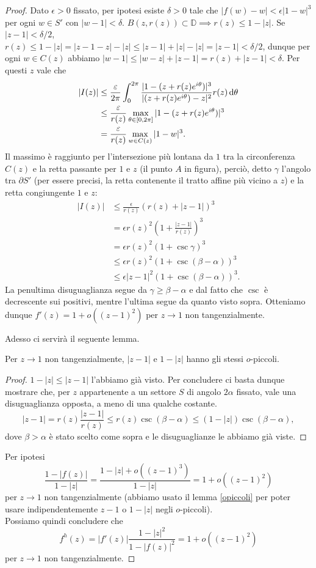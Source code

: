 \begin{proof}
  Dato $\epsilon>0$ fissato, per ipotesi esiste $\delta>0$ tale che $|f(w)-w|<\epsilon|1-w|^3$ per ogni $w \in S'$ con $|w-1|<\delta$. $B(z,r(z)) \subset \mathbb{D} \implies r(z) \le 1-|z|$. Se $|z-1|<\delta/2$, $r(z) \le 1-|z|=|z-1-z|-|z| \le |z-1|+|z|-|z|=|z-1|<\delta/2$, dunque per ogni $w \in C(z)$ abbiamo $|w-1| \le |w-z|+|z-1|=r(z)+|z-1|<\delta$. Per questi $z$ vale che
  \begin{align*}
    |I(z)| & \le \frac{\varepsilon}{2\pi} \int_0^{2\pi} \frac{|1-(z+r(z)e^{i\theta})|^3}{|(z+r(z)e^{i\theta})-z|^2}r(z)\mathop{}\!\mathrm{d}\theta \\
    & \le \frac{\varepsilon}{r(z)}\max_{\theta \in [0,2\pi]} |1-(z+r(z)e^{i\theta})|^3 \\
    & =\frac{\varepsilon}{r(z)}\max_{w \in C(z)}|1-w|^3.
  \end{align*}
  Il massimo è raggiunto per l'intersezione più lontana da $1$ tra la circonferenza $C(z)$ e la retta passante per $1$ e $z$ (il punto $A$ in figura), perciò, detto $\gamma$ l'angolo tra $\partial S'$ (per essere precisi, la retta contenente il tratto affine più vicino a $z$) e la retta congiungente $1$ e $z$:
  \begin{align*}
    |I(z)| & \le \frac{\epsilon}{r(z)}(r(z)+|z-1|)^3 \\
    & =\epsilon r(z)^2\left(1+\frac{|z-1|}{r(z)}\right)^3 \\
    & =\epsilon r(z)^2(1+\csc\gamma)^3 \\
    & \le \epsilon r(z)^2(1+\csc(\beta-\alpha))^3 \\
    & \le \epsilon |z-1|^2(1+\csc(\beta-\alpha))^3.
  \end{align*}
  La penultima disuguaglianza segue da $\gamma \ge \beta-\alpha$ e dal fatto che $\csc$ è decrescente sui positivi, mentre l'ultima segue da quanto visto sopra. Otteniamo dunque $f'(z)=1+o((z-1)^2)$ per $z \longrightarrow 1$ non tangenzialmente.

  Adesso ci servirà il seguente lemma.

  \begin{lm} \label{opiccoli}
    Per $z \longrightarrow 1$ non tangenzialmente, $|z-1|$ e $1-|z|$ hanno gli stessi $o$-piccoli.
  \end{lm}

  \begin{proof}
    $1-|z| \le |z-1|$ l'abbiamo già visto. Per concludere ci basta dunque mostrare che, per $z$ appartenente a un settore $S$ di angolo $2\alpha$ fissato, vale una disuguaglianza opposta, a meno di una qualche costante.
    $$|z-1|=r(z)\frac{|z-1|}{r(z)} \le r(z)\csc(\beta-\alpha) \le (1-|z|)\csc(\beta-\alpha),$$
    dove $\beta>\alpha$ è stato scelto come sopra e le disuguaglianze le abbiamo già viste.
  \end{proof}

  Per ipotesi
  $$\frac{1-|f(z)|}{1-|z|}=\frac{1-|z|+o((z-1)^3)}{1-|z|}=1+o((z-1)^2)$$
  per $z \longrightarrow 1$ non tangenzialmente (abbiamo usato il lemma \ref{opiccoli} per poter usare indipendentemente $z-1$ o $1-|z|$ negli $o$-piccoli). \\
  Possiamo quindi concludere che
  $$f^h(z)=|f'(z)|\frac{1-|z|^2}{1-|f(z)|^2}=1+o((z-1)^2)$$
  per $z \longrightarrow 1$ non tangenzialmente.
\end{proof}

